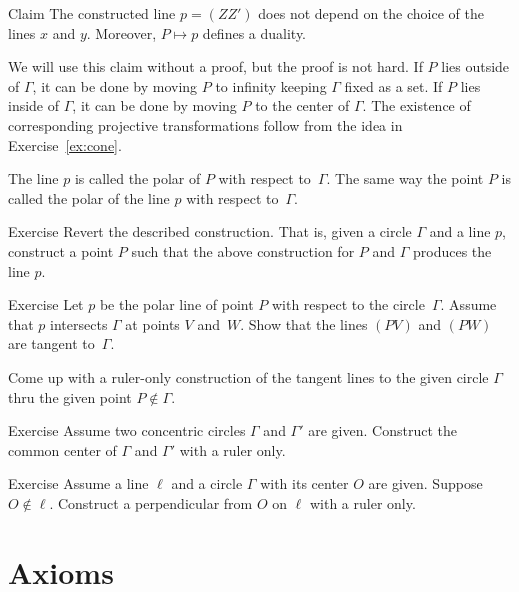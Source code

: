 \begin{thm}{Claim}\label{clm:polar}
The constructed line $p=(ZZ')$ does not depend on the choice of the lines $x$ and $y$.
Moreover, $P\mapsto p$ defines a duality.
\end{thm}

We will use this claim without a proof, but the proof is not hard.
If $P$ lies outside of $\Gamma$, it can be done by moving $P$ to infinity keeping $\Gamma$ fixed as a set.
If $P$ lies inside of $\Gamma$, it can be done by moving $P$ to the center of $\Gamma$.
The existence of corresponding projective transformations follow from the idea in Exercise~\ref{ex:cone}.


The line $p$ is called the polar of $P$ with respect to~$\Gamma$.
The same way the point $P$ is called the polar of the line $p$ with respect to~$\Gamma$.

\begin{thm}{Exercise}\label{ex:revert}
Revert the described construction.
That is, given a circle $\Gamma$ and a line $p$, construct a point $P$ such that the above construction for $P$ and $\Gamma$ produces the line $p$.
\end{thm}


\begin{thm}{Exercise}\label{ex:tangent ruler}
Let $p$ be the polar line of point $P$ with respect to the circle~$\Gamma$.
Assume that $p$ intersects $\Gamma$ at points $V$ and~$W$.
Show that the lines $(PV)$ and $(PW)$ are tangent to~$\Gamma$.

Come up with a ruler-only construction of the tangent lines to the given circle $\Gamma$ thru the given point $P\notin\Gamma$.
\end{thm}

\begin{thm}{Exercise}\label{ex:concentric-circ}
Assume two concentric circles $\Gamma$ and $\Gamma'$ are given.
Construct the common center of $\Gamma$ and $\Gamma'$ with a ruler only.
\end{thm}

\begin{thm}{Exercise}\label{ex:proj-perp}
Assume a line $\ell$ and a circle $\Gamma$ with its center $O$ are given.
Suppose $O\notin \ell$.
Construct a perpendicular from $O$ on $\ell$ with a ruler only.
\end{thm}

\section*{Axioms}

